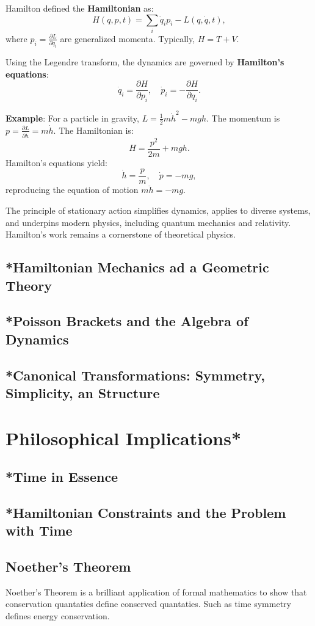 Hamilton defined the \textbf{Hamiltonian} as:
\[
H(q, p, t) = \sum_i \dot{q}_i p_i - L(q, \dot{q}, t),
\]
where \( p_i = \frac{\partial L}{\partial \dot{q}_i} \) are generalized momenta. Typically, \( H = T + V \).

Using the Legendre transform, the dynamics are governed by \textbf{Hamilton's equations}:
\[
\dot{q}_i = \frac{\partial H}{\partial p_i}, \quad \dot{p}_i = -\frac{\partial H}{\partial q_i}.
\]

\textbf{Example}: For a particle in gravity, \( L = \frac{1}{2} m \dot{h}^2 - mgh \). The momentum is \( p = \frac{\partial L}{\partial \dot{h}} = m \dot{h} \). The Hamiltonian is:
\[
H = \frac{p^2}{2m} + mgh.
\]
Hamilton's equations yield:
\[
\dot{h} = \frac{p}{m}, \quad \dot{p} = -mg,
\]
reproducing the equation of motion \( m \ddot{h} = -mg \).

The principle of stationary action simplifies dynamics, applies to diverse systems, and underpins modern physics, including quantum mechanics and relativity. Hamilton's work remains a cornerstone of theoretical physics.
\subsection{*Hamiltonian Mechanics ad a Geometric Theory}
\subsection{*Poisson Brackets and the Algebra of Dynamics}
\subsection{*Canonical Transformations: Symmetry, Simplicity, an Structure}

\section{Philosophical Implications*}
\subsection{*Time in Essence}
\subsection{*Hamiltonian Constraints and the Problem with Time}
\subsection{Noether's Theorem}
Noether's Theorem is a brilliant application of formal mathematics to show that conservation quantaties define conserved quantaties. Such as time
symmetry defines energy conservation.

